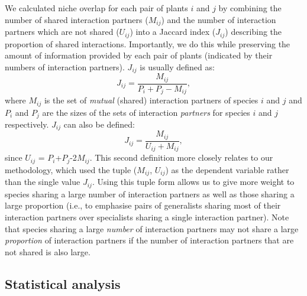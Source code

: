 \documentclass[12pt]{article}
\begin{document}
\begin{spacing}{1.5}
    We calculated niche overlap for each pair of plants $i$ and $j$ by 
    combining the number of shared interaction
    partners ($M_{ij}$) and the number of interaction partners which are not
    shared ($U_{ij}$) into a Jaccard index ($J_{ij}$) describing 
    the proportion of shared interactions. Importantly, we do this while 
    preserving the amount of information provided by each pair of plants
    (indicated by their numbers of interaction partners). $J_{ij}$ is usually defined as: 
    \begin{equation}
      J_{ij} = \frac{M_{ij}}{P_i+P_j-M_{ij}} ,
    \end{equation}
    where $M_{ij}$ is the set of \emph{mutual} (shared) interaction partners of 
    species $i$ and $j$ and $P_i$ and $P_j$ are the sizes of the sets of interaction 
    \emph{partners} for species $i$ and $j$ respectively. $J_{ij}$ can also be defined:
    \begin{equation}
      J_{ij} = \frac{M_{ij}}{U_{ij}+M_{ij}} ,
    \end{equation}
    since $U_{ij}$ = $P_{i}$+$P_{j}$-2$M_{ij}$. This second definition more closely
    relates to our methodology, which used the tuple ($M_{ij}$, $U_{ij}$) as the
    dependent variable rather than the single value $J_{ij}$. Using this tuple form
    allows us to give more 
    weight to species sharing a large number of interaction partners as well as 
    those sharing a large proportion (i.e., to emphasise pairs of generalists 
    sharing most of their interaction partners over specialists sharing a single 
    interaction partner). Note that species sharing a large \emph{number} of interaction partners may not share a large \emph{proportion} of interaction partners if the number of interaction partners that are not shared is also large. %


  \subsection*{Statistical analysis} 


\end{spacing}
\end{document}
